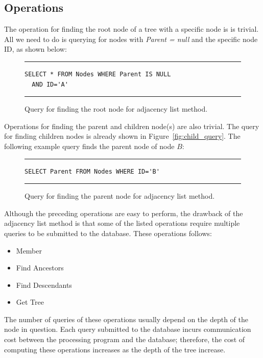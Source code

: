 \subsection{Operations}

The operation for finding the root node of a tree with a specific node is is trivial. All we need to do is querying for nodes with \emph{Parent = null} and the specific node ID, as shown below:

\begin{figure}[h]
\hrule\vspace{6px}
\begin{verbatim}
SELECT * FROM Nodes WHERE Parent IS NULL
  AND ID='A'
\end{verbatim}
\hrule
\caption{Query for finding the root node for adjacency list method.\label{fig:adj_list_find_root}}
\end{figure}

Operations for finding the parent and children node(s) are also trivial. The query for finding children nodes is already shown in Figure~\ref{fig:child_query}. The following example query finds the parent node of node $B$:

\begin{figure}[h]
\hrule\vspace{6px}
\begin{verbatim}
SELECT Parent FROM Nodes WHERE ID='B'
\end{verbatim}
\hrule
\caption{Query for finding the parent node for adjacency list method.\label{fig:adj_list_find_parent}}
\end{figure}

Although the preceding operations are easy to perform, the drawback of the adjacency list method is that some of the listed operations require multiple queries to be submitted to the database. These operations follows:

\begin{itemize}
\item Member
\item Find Ancestors
\item Find Descendants
\item Get Tree
\end{itemize}

The number of queries of these operations usually depend on the depth of the node in question. Each query submitted to the database incurs communication cost between the processing program and the database; therefore, the cost of computing these operations increases as the depth of the tree increase.

